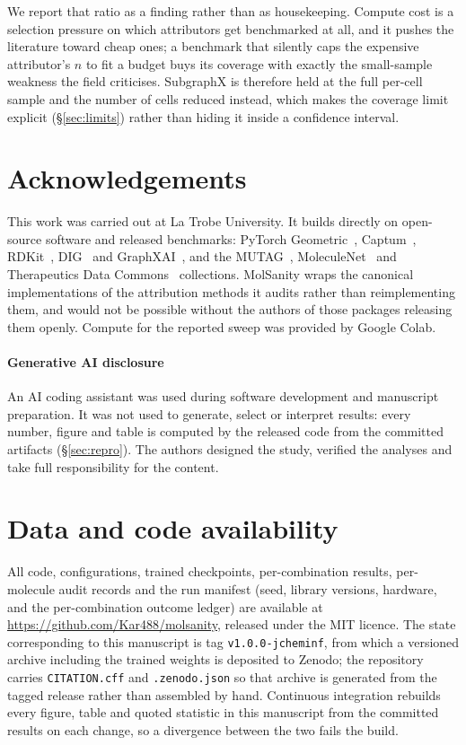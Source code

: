 We report that ratio as a finding rather than as housekeeping. Compute cost is
a selection pressure on which attributors get benchmarked at all, and it pushes
the literature toward cheap ones; a benchmark that silently caps the expensive
attributor's $n$ to fit a budget buys its coverage with exactly the small-sample
weakness the field criticises. SubgraphX is therefore held at the full
per-cell sample and the number of cells reduced instead, which makes the
coverage limit explicit (\S\ref{sec:limits}) rather than hiding it inside a
confidence interval.\fi{}

\section{Acknowledgements}

This work was carried out at La Trobe University. It builds directly on
open-source software and released benchmarks: PyTorch Geometric~\cite{pyg},
Captum~\cite{captum}, RDKit~\cite{rdkit}, DIG~\cite{dig} and
GraphXAI~\cite{graphxai}, and the MUTAG~\cite{mutag},
MoleculeNet~\cite{moleculenet} and Therapeutics Data Commons~\cite{tdc}
collections. MolSanity wraps the canonical implementations of the attribution
methods it audits rather than reimplementing them, and would not be possible
without the authors of those packages releasing them openly. Compute for the
reported sweep was provided by Google Colab.

\paragraph{Generative AI disclosure} An AI coding assistant was used during
software development and manuscript preparation. It was not used to generate,
select or interpret results: every number, figure and table is computed by the
released code from the committed artifacts (\S\ref{sec:repro}). The authors
designed the study, verified the analyses and take full responsibility for the
content.

\section{Data and code availability}
\label{sec:availability}

All code, configurations, trained checkpoints, per-combination results,
per-molecule audit records and the run manifest (seed, library versions,
hardware, and the per-combination outcome ledger) are available at
\url{https://github.com/Kar488/molsanity}, released under the MIT licence. The
state corresponding to this manuscript is tag \texttt{v1.0.0-jcheminf}, from
which a versioned archive including the trained weights is deposited to
Zenodo; the repository carries \texttt{CITATION.cff} and
\texttt{.zenodo.json} so that archive is generated from the tagged release
rather than assembled by hand. Continuous integration rebuilds every figure,
table and quoted statistic in this manuscript from the committed results on
each change, so a divergence between the two fails the build.

